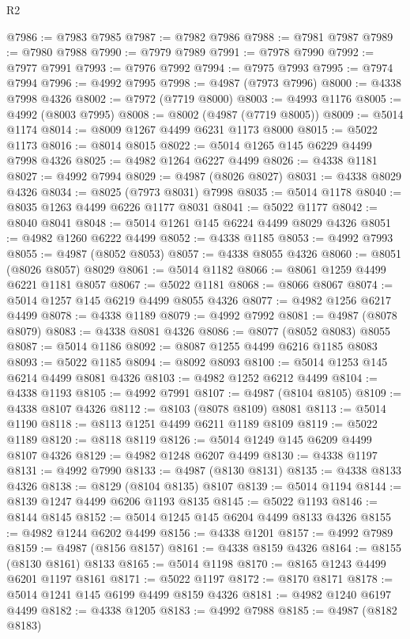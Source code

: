 \begin{lexlean}{R2}
\begin{coremodule}
@7986 := @7983 @7985
@7987 := @7982 @7986
@7988 := @7981 @7987
@7989 := @7980 @7988
@7990 := @7979 @7989
@7991 := @7978 @7990
@7992 := @7977 @7991
@7993 := @7976 @7992
@7994 := @7975 @7993
@7995 := @7974 @7994
@7996 := @4992 @7995
@7998 := @4987 (@7973 @7996)
@8000 := @4338 @7998 @4326
@8002 := @7972 (@7719 @8000)
@8003 := @4993 @1176
@8005 := @4992 (@8003 @7995)
@8008 := @8002 (@4987 (@7719 @8005))
@8009 := @5014 @1174
@8014 := @8009 @1267 @4499 @6231 @1173 @8000
@8015 := @5022 @1173
@8016 := @8014 @8015
@8022 := @5014 @1265 @145 @6229 @4499 @7998 @4326
@8025 := @4982 @1264 @6227 @4499
@8026 := @4338 @1181
@8027 := @4992 @7994
@8029 := @4987 (@8026 @8027)
@8031 := @4338 @8029 @4326
@8034 := @8025 (@7973 @8031) @7998
@8035 := @5014 @1178
@8040 := @8035 @1263 @4499 @6226 @1177 @8031
@8041 := @5022 @1177
@8042 := @8040 @8041
@8048 := @5014 @1261 @145 @6224 @4499 @8029 @4326
@8051 := @4982 @1260 @6222 @4499
@8052 := @4338 @1185
@8053 := @4992 @7993
@8055 := @4987 (@8052 @8053)
@8057 := @4338 @8055 @4326
@8060 := @8051 (@8026 @8057) @8029
@8061 := @5014 @1182
@8066 := @8061 @1259 @4499 @6221 @1181 @8057
@8067 := @5022 @1181
@8068 := @8066 @8067
@8074 := @5014 @1257 @145 @6219 @4499 @8055 @4326
@8077 := @4982 @1256 @6217 @4499
@8078 := @4338 @1189
@8079 := @4992 @7992
@8081 := @4987 (@8078 @8079)
@8083 := @4338 @8081 @4326
@8086 := @8077 (@8052 @8083) @8055
@8087 := @5014 @1186
@8092 := @8087 @1255 @4499 @6216 @1185 @8083
@8093 := @5022 @1185
@8094 := @8092 @8093
@8100 := @5014 @1253 @145 @6214 @4499 @8081 @4326
@8103 := @4982 @1252 @6212 @4499
@8104 := @4338 @1193
@8105 := @4992 @7991
@8107 := @4987 (@8104 @8105)
@8109 := @4338 @8107 @4326
@8112 := @8103 (@8078 @8109) @8081
@8113 := @5014 @1190
@8118 := @8113 @1251 @4499 @6211 @1189 @8109
@8119 := @5022 @1189
@8120 := @8118 @8119
@8126 := @5014 @1249 @145 @6209 @4499 @8107 @4326
@8129 := @4982 @1248 @6207 @4499
@8130 := @4338 @1197
@8131 := @4992 @7990
@8133 := @4987 (@8130 @8131)
@8135 := @4338 @8133 @4326
@8138 := @8129 (@8104 @8135) @8107
@8139 := @5014 @1194
@8144 := @8139 @1247 @4499 @6206 @1193 @8135
@8145 := @5022 @1193
@8146 := @8144 @8145
@8152 := @5014 @1245 @145 @6204 @4499 @8133 @4326
@8155 := @4982 @1244 @6202 @4499
@8156 := @4338 @1201
@8157 := @4992 @7989
@8159 := @4987 (@8156 @8157)
@8161 := @4338 @8159 @4326
@8164 := @8155 (@8130 @8161) @8133
@8165 := @5014 @1198
@8170 := @8165 @1243 @4499 @6201 @1197 @8161
@8171 := @5022 @1197
@8172 := @8170 @8171
@8178 := @5014 @1241 @145 @6199 @4499 @8159 @4326
@8181 := @4982 @1240 @6197 @4499
@8182 := @4338 @1205
@8183 := @4992 @7988
@8185 := @4987 (@8182 @8183)

\end{coremodule}
\end{lexlean}

